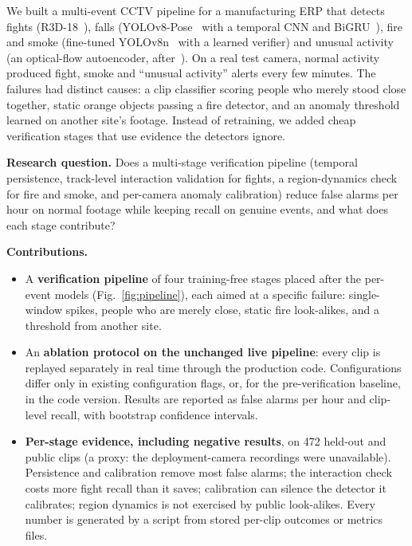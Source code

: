 \documentclass[conference]{IEEEtran}
\begin{document}
We built a multi-event CCTV pipeline for a manufacturing ERP that detects fights (R3D-18~\cite{tran2018}), falls (YOLOv8-Pose~\cite{yolov8,maji2022} with a temporal CNN and BiGRU~\cite{cho2014}), fire and smoke (fine-tuned YOLOv8n~\cite{redmon2016,yolov8} with a learned verifier) and unusual activity (an optical-flow autoencoder, after~\cite{hasan2016}). On a real test camera, normal activity produced fight, smoke and ``unusual activity'' alerts every few minutes. The failures had distinct causes: a clip classifier scoring people who merely stood close together, static orange objects passing a fire detector, and an anomaly threshold learned on another site's footage. Instead of retraining, we added cheap verification stages that use evidence the detectors ignore.

\textbf{Research question.} Does a multi-stage verification pipeline (temporal persistence, track-level interaction validation for fights, a region-dynamics check for fire and smoke, and per-camera anomaly calibration) reduce false alarms per hour on normal footage while keeping recall on genuine events, and what does each stage contribute?

\textbf{Contributions.}
\begin{itemize}
\item A \textbf{verification pipeline} of four training-free stages placed after the per-event models (Fig.~\ref{fig:pipeline}), each aimed at a specific failure: single-window spikes, people who are merely close, static fire look-alikes, and a threshold from another site.
\item An \textbf{ablation protocol on the unchanged live pipeline}: every clip is replayed separately in real time through the production code. Configurations differ only in existing configuration flags, or, for the pre-verification baseline, in the code version. Results are reported as false alarms per hour and clip-level recall, with bootstrap confidence intervals.
\item \textbf{Per-stage evidence, including negative results}, on 472 held-out and public clips (a proxy: the deployment-camera recordings were unavailable). Persistence and calibration remove most false alarms; the interaction check costs more fight recall than it saves; calibration can silence the detector it calibrates; region dynamics is not exercised by public look-alikes. Every number is generated by a script from stored per-clip outcomes or metrics files.
\end{itemize}
\end{document}
